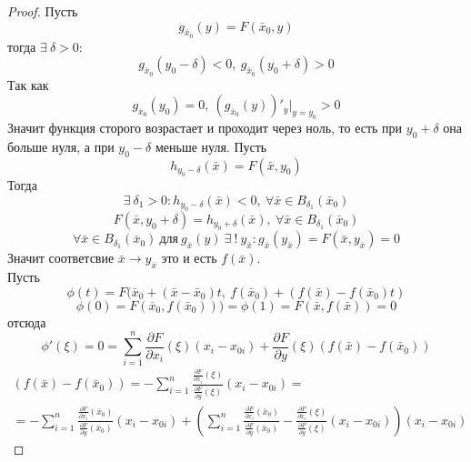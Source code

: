 \begin{proof}
    Пусть 
    \[g_{\bar{x}_0}(y)=F(\bar{x}_0,y)\] 
    тогда $\exists\ \delta>0$:
    \[g_{\bar{x}_0}(y_0-\delta)<0,\ g_{\bar{x}_0}(y_0+\delta)>0\]
    Так как 
    \[g_{\bar{x}_0}(y_0)=0,\ (g_{\bar{x}_0}(y))'_y|_{y=y_0}>0\]
    Значит функция сторого возрастает и проходит через ноль, то есть при $y_0+\delta$ она больше нуля, а при $y_0-\delta$ меньше нуля. Пусть
    \[h_{y_0-\delta}(\bar{x})=F(\bar{x},y_0)\] 
    Тогда 
    \[\exists\ \delta_1>0: h_{y_0-\delta}(\bar{x})<0,\ \forall \bar{x}\in B_{\delta_1}(\bar{x}_0)\]
    \[F(\bar{x}, y_0+\delta)=h_{y_0+\delta}(\bar{x}),\ \forall \bar{x}\in B_{\delta_1}(\bar{x}_0)\]
    \[\forall \bar{x}\in B_{\delta_1}(\bar{x}_0)\ \text{для}\ g_{\bar{x}}(y)\ \exists\ !\ y_{\bar{x}}: g_{\bar{x}}(y_{\bar{x}})=F(\bar{x},y_{\bar{x}})=0\]
    Значит соответсвие $\bar{x}\to y_{\bar{x}}$ это и есть $f(\bar{x})$.\\
    Пусть 
    \[\phi(t)=F(\bar{x}_0+(\bar{x}-\bar{x}_0)t,\ f(\bar{x}_0)+(f(\bar{x})-f(\bar{x}_0)t)\]
    \[\phi(0)=F(\bar{x}_0, f(\bar{x}_0)))=\phi(1)=F(\bar{x}, f(\bar{x}))=0\]
    отсюда
    \[\phi'(\xi)=0=\sum\limits_{i=1}^{n}\frac{\partial {F}}{\partial {x_i}}(\xi)(x_i-x_{0i})+\frac{\partial {F}}{\partial {y}}(\xi)(f(\bar{x})-f(\bar{x}_0))\]
    \begin{multline*}
        (f(\bar{x})-f(\bar{x}_0))=-\sum\limits_{i=1}^{n}\frac{\frac{\partial {F}}{\partial {x_i}}(\xi)}{\frac{\partial {F}}{\partial {y}}(\xi)}(x_i-x_{0i})=\\
        =-\sum\limits_{i=1}^{n}\frac{\frac{\partial {F}}{\partial {x_i}}(\bar{x}_0)}{\frac{\partial {F}}{\partial {y}}(\bar{x}_0)}(x_i-x_{0i})+\left(\sum\limits_{i=1}^{n}\frac{\frac{\partial {F}}{\partial {x_i}}(\bar{x}_0)}{\frac{\partial {F}}{\partial {y}}(\bar{x}_0)}-\frac{\frac{\partial {F}}{\partial {x_i}}(\xi)}{\frac{\partial {F}}{\partial {y}}(\xi)}(x_i-x_{0i})\right)(x_i-x_{0i})
    \end{multline*} 
\end{proof} 
